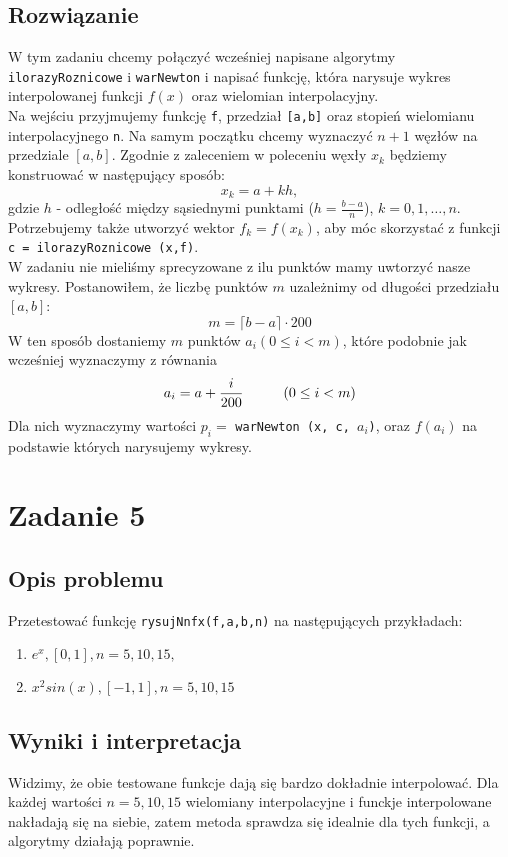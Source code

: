\documentclass[a4paper]{article}
\newcommand\tab[1][1cm]{\hspace*{#1}}
\begin{document}
    
    \subsection{Rozwiązanie}
    W tym zadaniu chcemy połączyć wcześniej napisane algorytmy \texttt{ilorazyRoznicowe} i \texttt{warNewton} i napisać funkcję, która narysuje wykres interpolowanej funkcji $f(x)$ oraz wielomian interpolacyjny. \\
    Na wejściu przyjmujemy funkcję \texttt{f}, przedział \texttt{[a,b]} oraz stopień wielomianu interpolacyjnego \texttt{n}.
    Na samym początku chcemy wyznaczyć $n+1$ węzłów na przedziale $[a,b]$. Zgodnie z zaleceniem w poleceniu węxły $x_k$ będziemy konstruować w następujący sposób:
    \[ x_k = a + kh, \]
    gdzie  $h$ - odległość między sąsiednymi punktami ($h = \frac{b-a}{n}$), $k = 0,1,\dots, n$.
    Potrzebujemy także utworzyć wektor $f_k = f(x_k)$, aby móc skorzystać z funkcji \texttt{c = ilorazyRoznicowe (x,f)}. \\
    W zadaniu nie mieliśmy sprecyzowane z ilu punktów mamy uwtorzyć nasze wykresy. Postanowiłem, że liczbę punktów $m$ uzależnimy od długości przedziału $[a,b]$:
    \[ m = \lceil b-a \rceil \cdot 200\]
    W ten sposób dostaniemy $m$ punktów $a_i (0 \leq i < m)$, które podobnie jak wcześniej wyznaczymy z równania
    \[ a_i = a + \frac{i}{200} \tab (0 \leq i < m)\]
    Dla nich wyznaczymy wartości $p_i = $ \texttt{warNewton (x, c, $a_i$)}, oraz $f(a_i)$ na podstawie których narysujemy wykresy.

\section{Zadanie 5}
    \subsection{Opis problemu}
    Przetestować funkcję \texttt{rysujNnfx(f,a,b,n)} na następujących przykładach:
    \begin{enumerate}
        \item $e^x, [0, 1] , n = 5, 10, 15,$
        \item $x^2sin(x), [-1, 1] , n = 5, 10, 15$
    \end{enumerate}

    \subsection{Wyniki i interpretacja}
    Widzimy, że obie testowane funkcje dają się bardzo dokładnie interpolować. Dla każdej wartości $n = 5,10,15$ wielomiany interpolacyjne i funckje interpolowane nakładają się na siebie, zatem metoda sprawdza się idealnie dla tych funkcji, a algorytmy działają poprawnie.
\end{document}
